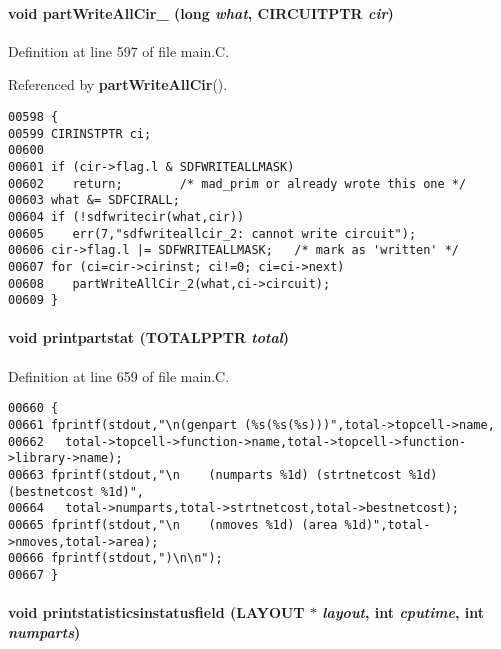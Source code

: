 \paragraph{\setlength{\rightskip}{0pt plus 5cm}void part\-Write\-All\-Cir\_ (long {\em what}, CIRCUITPTR {\em cir})\hspace{0.3cm}{\tt  [static]}}\hfill



Definition at line 597 of file main.C.

Referenced by {\bf part\-Write\-All\-Cir}().\small\begin{verbatim}00598 {
00599 CIRINSTPTR ci;
00600 
00601 if (cir->flag.l & SDFWRITEALLMASK)
00602    return;        /* mad_prim or already wrote this one */
00603 what &= SDFCIRALL;
00604 if (!sdfwritecir(what,cir))
00605    err(7,"sdfwriteallcir_2: cannot write circuit");
00606 cir->flag.l |= SDFWRITEALLMASK;   /* mark as 'written' */
00607 for (ci=cir->cirinst; ci!=0; ci=ci->next)
00608    partWriteAllCir_2(what,ci->circuit);
00609 }
\end{verbatim}\normalsize 
\label{main.C_a17}
\paragraph{\setlength{\rightskip}{0pt plus 5cm}void printpartstat ({\bf TOTALPPTR} {\em total})}\hfill



Definition at line 659 of file main.C.\small\begin{verbatim}00660 {
00661 fprintf(stdout,"\n(genpart (%s(%s(%s)))",total->topcell->name,
00662   total->topcell->function->name,total->topcell->function->library->name);
00663 fprintf(stdout,"\n    (numparts %1d) (strtnetcost %1d) (bestnetcost %1d)",
00664   total->numparts,total->strtnetcost,total->bestnetcost);
00665 fprintf(stdout,"\n    (nmoves %1d) (area %1d)",total->nmoves,total->area);
00666 fprintf(stdout,")\n\n");
00667 }
\end{verbatim}\normalsize 
\label{main.C_a14}
\paragraph{\setlength{\rightskip}{0pt plus 5cm}void printstatisticsinstatusfield (LAYOUT $\ast$ {\em layout}, int {\em cputime}, int {\em numparts})\hspace{0.3cm}{\tt  [static]}}\hfill




